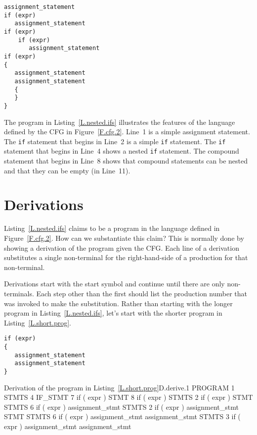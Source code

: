\documentclass[letterpaper,12pt,openany,reqno]{book}%
\newcommand{\code}[1] {\lstinline[breaklines=yes,breakatwhitespace=yes]{#1}}
\begin{document}
\begin{lstlisting}[caption={Sample program in the language defined by the CFG in Figure~\ref{F.cfg.2}},label=L.nested.ifs]
assignment_statement
if (expr)
   assignment_statement
if (expr)
    if (expr)
       assignment_statement
if (expr)
{
   assignment_statement
   assignment_statement
   {
   }
}
\end{lstlisting}

The program in Listing~\ref{L.nested.ifs} illustrates the features of the language defined by the CFG in Figure~\ref{F.cfg.2}. Line~1 is a simple assignment statement. The \code{if} statement that begins in Line~2 is a simple \code{if} statement. The \code{if} statement that begins in Line~4 shows a nested \code{if} statement. The compound statement that begins in Line~8 shows that compound statements can be nested and that they can be empty (in Line~11).

\section{Derivations}

Listing~\ref{L.nested.ifs} claims to be a program in the language defined in Figure~\ref{F.cfg.2}. How can we substantiate this claim? This is normally done by showing a derivation of the program given the CFG. Each line of a derivation substitutes a single non-terminal for the right-hand-side of a production for that non-terminal. 

Derivations start with the start symbol and continue until there are only non-terminals. Each step other than the first should list the production number that was invoked to make the substitution. Rather than starting with the longer program in Listing~\ref{L.nested.ifs}, let's start with the shorter program in Listing~\ref{L.short.prog}.

\begin{lstlisting}[caption={Short program program in the language defined by the CFG in Figure~\ref{F.cfg.2}. The derivation of this program is given in Derivation~\ref{D.derive.1}},label=L.short.prog]
if (expr)
{
   assignment_statement
   assignment_statement
}
\end{lstlisting}

\begin{derivation}{Derivation of the program in Listing~\ref{L.short.prog}}{D.derive.1}
    PROGRAM
1   STMTS
4   IF_STMT
7   if ( expr ) STMT
8   if ( expr ) { STMTS }
2   if ( expr ) { STMT STMTS }
6   if ( expr ) { assignment_stmt STMTS }
2   if ( expr ) { assignment_stmt STMT STMTS }
6   if ( expr ) { assignment_stmt assignment_stmt STMTS }
3   if ( expr ) { assignment_stmt assignment_stmt }
\end{derivation}
\end{document}
